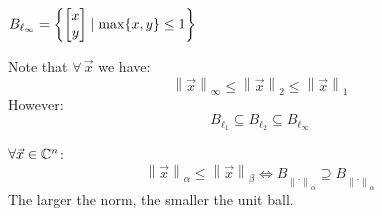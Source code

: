 \documentclass[letterpaper,12pt,fleqn]{article}
\newcommand{\norm}[1]{\left\lVert#1\right\rVert}
\newcommand{\nc}{\norm{\cdot}}
\newcommand{\vx}{\vec{x}}
\renewcommand{\a}{\alpha}
\renewcommand{\b}{\beta}
\begin{document}
\begin{minipage}{3in}
  $B_{\ell_{\infty}}=\left\{\begin{bmatrix} x \\ y \end{bmatrix}\mid\max\{x,y\}\le1\right\}$
\end{minipage}
\begin{minipage}{3in}
\end{minipage}

Note that $\forall\,\vx$ we have:
\[\norm{\vx}_{\infty}\le\norm{\vx}_2\le\norm{\vx}_1\]
However:
\[B_{\ell_1}\subseteq B_{\ell_2}\subseteq B_{\ell_{\infty}}\]

\begin{theorem}
  $\forall\vx\in\C^n$:
  \[\norm{\vx}_{\a}\le\norm{\vx}_{\b}\iff B_{\nc_{\a}}\supseteq B_{\nc_{\a}}\]
  The larger the norm, the smaller the unit ball.
\end{theorem}
\end{document}
